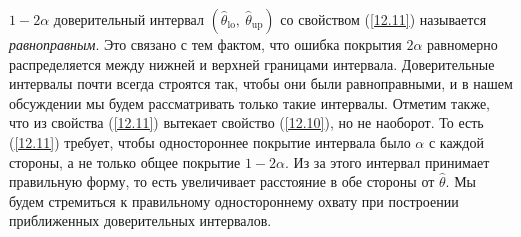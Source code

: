 $1 - 2 \alpha$ доверительный интервал $(\widehat{\theta}_{\text{lo}}, \ \widehat{\theta}_{\text{up}})$ со свойством (\ref{12.11}) называется \textit{равноправным}. Это связано с тем фактом, что ошибка покрытия $2 \alpha$ равномерно распределяется между нижней и верхней границами интервала. Доверительные интервалы почти всегда строятся так, чтобы они были равноправными, и в нашем обсуждении мы будем рассматривать только такие интервалы. Отметим также, что из свойства (\ref{12.11}) вытекает свойство (\ref{12.10}), но не наоборот. То есть (\ref{12.11}) требует, чтобы одностороннее покрытие интервала было $\alpha$  с каждой стороны, а не только общее покрытие $1 - 2 \alpha$. Из за этого интервал принимает правильную форму, то есть увеличивает расстояние в обе стороны от $\widehat{\theta}$. Мы будем стремиться к правильному одностороннему охвату при построении приближенных доверительных интервалов.

